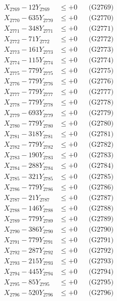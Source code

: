 \documentclass[a4paper,10pt]{article}
\begin{document}
{\begin{align}
X_{2769} - 12Y_{2769} &\leq +0 && \text{(G2769)} \\
X_{2770} - 635Y_{2770} &\leq +0 && \text{(G2770)} \\
\allowbreak
X_{2771} - 348Y_{2771} &\leq +0 && \text{(G2771)} \\
X_{2772} - 71Y_{2772} &\leq +0 && \text{(G2772)} \\
X_{2773} - 161Y_{2773} &\leq +0 && \text{(G2773)} \\
X_{2774} - 115Y_{2774} &\leq +0 && \text{(G2774)} \\
X_{2775} - 779Y_{2775} &\leq +0 && \text{(G2775)} \\
X_{2776} - 779Y_{2776} &\leq +0 && \text{(G2776)} \\
X_{2777} - 779Y_{2777} &\leq +0 && \text{(G2777)} \\
X_{2778} - 779Y_{2778} &\leq +0 && \text{(G2778)} \\
X_{2779} - 693Y_{2779} &\leq +0 && \text{(G2779)} \\
X_{2780} - 779Y_{2780} &\leq +0 && \text{(G2780)} \\
\allowbreak
X_{2781} - 318Y_{2781} &\leq +0 && \text{(G2781)} \\
X_{2782} - 779Y_{2782} &\leq +0 && \text{(G2782)} \\
X_{2783} - 190Y_{2783} &\leq +0 && \text{(G2783)} \\
X_{2784} - 288Y_{2784} &\leq +0 && \text{(G2784)} \\
X_{2785} - 321Y_{2785} &\leq +0 && \text{(G2785)} \\
X_{2786} - 779Y_{2786} &\leq +0 && \text{(G2786)} \\
X_{2787} - 21Y_{2787} &\leq +0 && \text{(G2787)} \\
X_{2788} - 146Y_{2788} &\leq +0 && \text{(G2788)} \\
X_{2789} - 779Y_{2789} &\leq +0 && \text{(G2789)} \\
X_{2790} - 386Y_{2790} &\leq +0 && \text{(G2790)} \\
\allowbreak
X_{2791} - 779Y_{2791} &\leq +0 && \text{(G2791)} \\
X_{2792} - 287Y_{2792} &\leq +0 && \text{(G2792)} \\
X_{2793} - 215Y_{2793} &\leq +0 && \text{(G2793)} \\
X_{2794} - 445Y_{2794} &\leq +0 && \text{(G2794)} \\
X_{2795} - 85Y_{2795} &\leq +0 && \text{(G2795)} \\
X_{2796} - 520Y_{2796} &\leq +0 && \text{(G2796)} \\

\end{align}}
\end{document}

